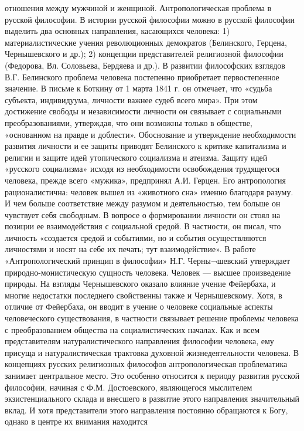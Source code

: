 \documentclass[12pt]{article}
\begin{document}
отношения между мужчиной и женщиной.
Антропологическая проблема в русской философии.
В истории русской философии можно в русской философии выделить два основных направления, касающихся
человека:
1) материалистические учения революционных демократов (Белинского, Герцена, Чернышевского и др.);
2) концепции представителей религиозной философии (Федорова, Вл. Соловьева, Бердяева и др.).
В развитии философских взглядов В.Г. Белинского проблема человека постепенно приобретает первостепенное
значение. В письме к Боткину от 1 марта 1841 г. он отмечает, что «судьба субъекта, индивидуума, личности  
важнее  судеб  всего  мира».  При  этом  достижение  свободы  и  независимости  личности  он  связывает  с
социальными преобразованиями, утверждая, что они возможны только в обществе, «основанном на правде и
доблести». Обоснование и утверждение необходимости развития личности и ее защиты приводят Белинского к
критике капитализма и религии и защите идей утопического социализма и атеизма.
Защиту идей «русского социализма» исходя из необходимости освобождения трудящегося человека, прежде
всего «мужика», предпринял А.И. Герцен. Его антропология рационалистична: человек вышел из «животного
сна» именно благодаря разуму. И чем больше соответствие между разумом и деятельностью, тем больше он
чувствует себя свободным. В вопросе о формировании личности он стоял на позиции ее взаимодействия с
социальной  средой.  В  частности,  он  писал,  что  личность  «создается  средой  и  событиями,  но  и  события
осуществляются личностями и носят на себе их печать; тут взаимодействие».
В  работе  «Антропологический  принцип  в  философии»  Н.Г.  Черны¬шевский  утверждает  природно-монистическую сущность человека. Человек — высшее произведение природы. На взгляды Чернышевского
оказало влияние учение Фейербаха, и многие недостатки последнего свойственны также и Чернышевскому.
Хотя,  в  отличие  от  Фейербаха,  он  вводит  в  учение  о  человеке  социальные  аспекты  человеческого
существования,  в  частности  связывает  решение  проблемы  человека  с  преобразованием  общества  на
социалистических началах. Как и всем представителям натуралистического направления философии человека,
ему присуща и натуралистическая трактовка духовной жизнедеятельности человека.
В концепциях русских религиозных философов антропологическая проблематика занимает центральное место.
Это особенно относится к периоду развития русской философии, начиная с Ф.М. Достоевского, являющегося
мыслителем экзистенциального склада и внесшего в развитие этого направления значительный вклад. И хотя
представители  этого  направления  постоянно  обращаются  к  Богу,  однако  в  центре  их  внимания  находится
\end{document}
